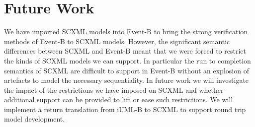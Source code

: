 \documentclass{easychair}
\begin{document}
\section{Future Work}
\label{sect:future-work}
We have imported SCXML models into Event-B to bring the 
strong verification methods of Event-B to SCXML models. 
However, the significant semantic differences between SCXML 
and Event-B meant that we were forced to restrict the kinds 
of SCXML models we can support.
In particular the run to completion semantics of SCXML are 
difficult to support in Event-B without an explosion of 
artefacts to model the necessary sequentiality. 
In future work we will investigate the impact of the 
restrictions we have imposed on SCXML and whether 
additional support can be provided to lift or ease
such restrictions.
We will implement a return translation from iUML-B to SCXML 
to support round trip model development. 








\end{document}
